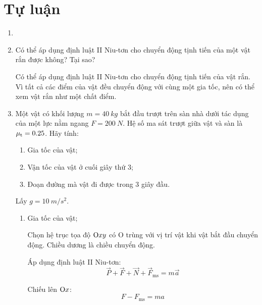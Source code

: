 \section{Tự luận}
\begin{enumerate}[label=\bfseries Câu \arabic*:]
	\item {}
	
	
	
	\item {}
	
	\cauhoi
	{Có thể áp dụng định luật II Niu-tơn cho chuyển động tịnh tiến của một vật rắn được không? Tại sao?
	}
	
	\loigiai
	{
	Có thể áp dụng định luật II Niu-tơn cho chuyển động tịnh tiến của vật rắn. Vì tất cả các điểm của vật đều chuyển động với cùng một gia tốc, nên có thể xem vật rắn như một chất điểm.
	}
	\item {}
	
	\cauhoi
	{Một vật có khối lượng $m=\SI{40}{kg}$ bắt đầu trượt trên sàn nhà dưới tác dụng của một lực nằm ngang $F=\SI{200}{N}$. Hệ số ma sát trượt giữa vật và sàn là $\mu _\text t = \SI{0.25}{}$. Hãy tính:
		\begin{enumerate}
			\item Gia tốc của vật;
			\item Vận tốc của vật ở cuối giây thứ 3;
			\item Đoạn đường mà vật đi được trong 3 giây đầu.
		\end{enumerate}
	Lấy $g=\SI{10}{m/s^2}$.
	}
	
	\loigiai
	{		\begin{enumerate}
			\item Gia tốc của vật;
			
	Chọn hệ trục tọa độ $\text Oxy$ có O trùng với vị trí vật khi vật bắt đầu chuyển động. Chiều dương là chiều chuyển động.
	
	Áp dụng định luật II Niu-tơn:
	$$\vec P + \vec F + \vec N + \vec F_\text{ms} = m \vec a$$
	
	Chiếu lên $\text O x$:
	$$F-F_\text{ms} = ma$$
	

\end{enumerate}}
\end{enumerate}
